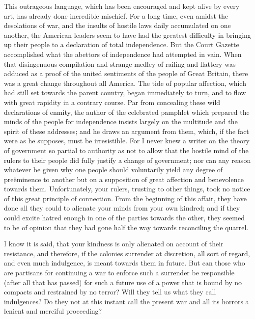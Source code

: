 This outrageous language, which has been encouraged and kept alive by every art, has already done incredible mischief. For a long time, even amidst the desolations of war, and the insults of hostile laws daily accumulated on one another, the American leaders seem to have had the greatest difficulty in bringing up their people to a declaration of total independence. But the Court Gazette accomplished what the abettors of independence had attempted in vain. When that disingenuous compilation and strange medley of railing and flattery was adduced as a proof of the united sentiments of the people of Great Britain, there was a great change throughout all America. The tide of popular affection, which had still set towards the parent country, began immediately to turn, and to flow with great rapidity in a contrary course. Par from concealing these wild declarations of enmity, the author of the celebrated pamphlet which prepared the minds of the people for independence insists largely on the multitude and the spirit of these addresses; and he draws an argument from them, which, if the fact were as he supposes, must be irresistible. For I never knew a writer on the theory of government so partial to authority as not to allow that the hostile mind of the rulers to their people did fully justify a change of government; nor can any reason whatever be given why one people should voluntarily yield any degree of preëminence to another but on a supposition of great affection and benevolence towards them. Unfortunately, your rulers, trusting to other things, took no notice of this great principle of connection. From the beginning of this affair, they have done all they could to alienate your minds from your own kindred; and if they could excite hatred enough in one of the parties towards the other, they seemed to be of opinion that they had gone half the way towards reconciling the quarrel.

I know it is said, that your kindness is only alienated on account of their resistance, and therefore, if the colonies surrender at discretion, all sort of regard, and even much indulgence, is meant towards them in future. But can those who are partisans for continuing a war to enforce such a surrender be responsible (after all that has passed) for such a future use of a power that is bound by no compacts and restrained by no terror? Will they tell us what they call indulgences? Do they not at this instant call the present war and all its horrors a lenient and merciful proceeding?

